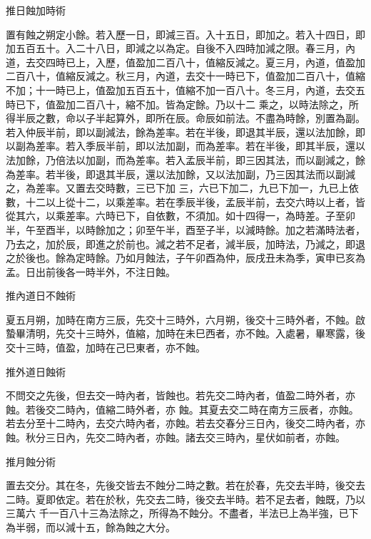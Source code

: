 \begin{pinyinscope}
 推日蝕加時術



 置有蝕之朔定小餘。若入歷一日，即減三百。入十五日，即加之。若入十四日，即加五百五十。入二十八日，即減之以為定。自後不入四時加減之限。春三月，內道，去交四時已上，入歷，值盈加二百八十，值縮反減之。夏三月，內道，值盈加二百八十，值縮反減之。秋三月，內道，去交十一時已下，值盈加二百八十，值縮不加；十一時已上，值盈加五百五十，值縮不加一百八十。冬三月，內道，去交五時已下，值盈加二百八十，縮不加。皆為定餘。乃以十二
 乘之，以時法除之，所得半辰之數，命以子半起算外，即所在辰。命辰如前法。不盡為時餘，別置為副。若入仲辰半前，即以副減法，餘為差率。若在半後，即退其半辰，還以法加餘，即以副為差率。若入季辰半前，即以法加副，而為差率。若在半後，即其半辰，還以法加餘，乃倍法以加副，而為差率。若入孟辰半前，即三因其法，而以副減之，餘為差率。若半後，即退其半辰，還以法加餘，又以法加副，乃三因其法而以副減之，為差率。又置去交時數，三已下加
 三，六已下加二，九已下加一，九已上依數，十二以上從十二，以乘差率。若在季辰半後，孟辰半前，去交六時以上者，皆從其六，以乘差率。六時已下，自依數，不須加。如十四得一，為時差。子至卯半，午至酉半，以時餘加之；卯至午半，酉至子半，以減時餘。加之若滿時法者，乃去之，加於辰，即進之於前也。減之若不足者，減半辰，加時法，乃減之，即退之於後也。餘為定時餘。乃如月蝕法，子午卯酉為仲，辰戌丑未為季，寅申已亥為孟。日出前後各一時半外，不注日蝕。



 推內道日不蝕術



 夏五月朔，加時在南方三辰，先交十三時外，六月朔，後交十三時外者，不蝕。啟蟄畢清明，先交十三時外，值縮，加時在未巳西者，亦不蝕。入處暑，畢寒露，後交十三時，值盈，加時在己巳東者，亦不蝕。



 推外道日蝕術



 不問交之先後，但去交一時內者，皆蝕也。若先交二時內者，值盈二時外者，亦蝕。若後交二時內，值縮二時外者，亦
 蝕。其夏去交二時在南方三辰者，亦蝕。若去分至十二時內，去交六時內者，亦蝕。若去交春分三日內，後交二時內者，亦蝕。秋分三日內，先交二時內者，亦蝕。諸去交三時內，星伏如前者，亦蝕。



 推月蝕分術



 置去交分。其在冬，先後交皆去不蝕分二時之數。若在於春，先交去半時，後交去二時。夏即依定。若在於秋，先交去二時，後交去半時。若不足去者，蝕既，乃以三萬六
 千一百八十三為法除之，所得為不蝕分。不盡者，半法已上為半強，已下為半弱，而以減十五，餘為蝕之大分。




\end{pinyinscope}
